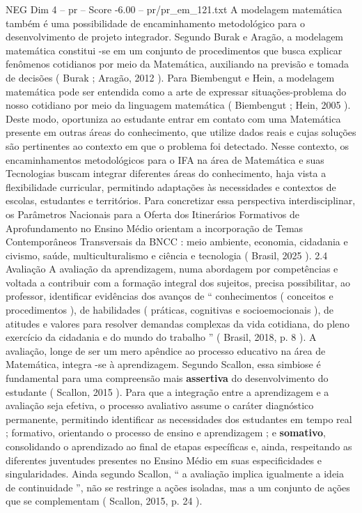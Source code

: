 \begin{textsample}{NEG Dim 4 – pr – Score -6.00 – pr/pr\_em\_121.txt}
A modelagem matemática também é uma possibilidade de encaminhamento metodológico para o desenvolvimento de projeto integrador.
Segundo Burak e Aragão, a modelagem matemática constitui -se em um conjunto de procedimentos que busca explicar fenômenos cotidianos por meio da Matemática, auxiliando na previsão e tomada de decisões ( Burak ; Aragão, 2012 ).
Para Biembengut e Hein, a modelagem matemática pode ser entendida como a arte de expressar situações-problema do nosso cotidiano por meio da linguagem matemática ( Biembengut ; Hein, 2005 ).
Deste modo, oportuniza ao estudante entrar em contato com uma Matemática presente em outras áreas do conhecimento, que utilize dados reais e cujas soluções são pertinentes ao contexto em que o problema foi detectado.
Nesse contexto, os encaminhamentos metodológicos para o IFA na área de Matemática e suas Tecnologias buscam integrar diferentes áreas do conhecimento, haja vista a flexibilidade curricular, permitindo adaptações às necessidades e contextos de escolas, estudantes e territórios.
Para concretizar essa perspectiva interdisciplinar, os Parâmetros Nacionais para a Oferta dos Itinerários Formativos de Aprofundamento no Ensino Médio orientam a incorporação de Temas Contemporâneos Transversais da BNCC : meio ambiente, economia, cidadania e civismo, saúde, multiculturalismo e ciência e tecnologia ( Brasil, 2025 ). 2.4 Avaliação A avaliação da aprendizagem, numa abordagem por competências e voltada a contribuir com a formação integral dos sujeitos, precisa possibilitar, ao professor, identificar evidências dos avanços de “ conhecimentos ( conceitos e procedimentos ), de habilidades ( práticas, cognitivas e socioemocionais ), de atitudes e valores para resolver demandas complexas da vida cotidiana, do pleno exercício da cidadania e do mundo do trabalho ” ( Brasil, 2018, p. 8 ).
A avaliação, longe de ser um mero apêndice ao processo educativo na área de Matemática, integra -se à aprendizagem.
Segundo Scallon, essa simbiose é fundamental para uma compreensão mais \textbf{assertiva} do desenvolvimento do estudante ( Scallon, 2015 ).
Para que a integração entre a aprendizagem e a avaliação seja efetiva, o processo avaliativo assume o caráter diagnóstico permanente, permitindo identificar as necessidades dos estudantes em tempo real ; formativo, orientando o processo de ensino e aprendizagem ; e \textbf{somativo}, consolidando o aprendizado ao final de etapas específicas e, ainda, respeitando as diferentes juventudes presentes no Ensino Médio em suas especificidades e singularidades.
Ainda segundo Scallon, “ a avaliação implica igualmente a ideia de continuidade ”, não se restringe a ações isoladas, mas a um conjunto de ações que se complementam ( Scallon, 2015, p. 24 ).

\end{textsample}
